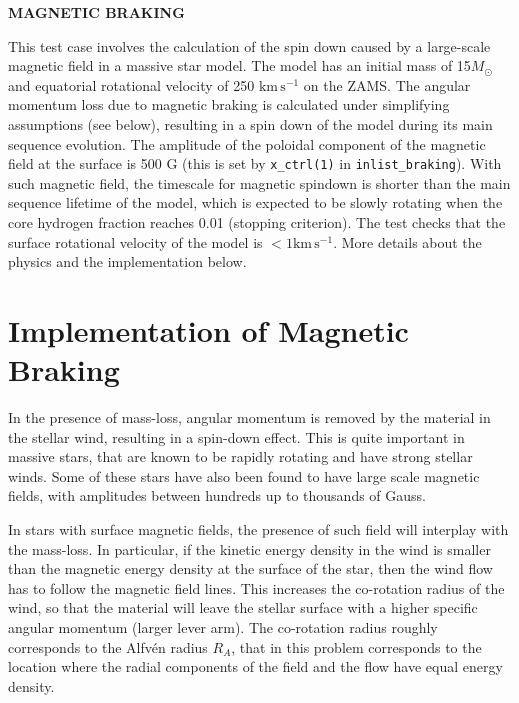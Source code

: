 \documentclass{article}
\newcommand{\unitstyle}[1]{\ensuremath{\mathrm{#1}}}
\newcommand{\second}{\unitstyle{s}}
\newcommand{\Msun}{\ensuremath{M_\odot}}
\newcommand{\kms}{\ensuremath{\mathrm{km} \,\second^{-1}}}
\begin{document}
	
	\begin{center}
		\begin{Large}
		       \textbf{MAGNETIC BRAKING}\\
		\end{Large}
	\end{center}



This test case involves the calculation of the spin down caused by a large-scale magnetic field in a massive star model. 
The model has an initial mass of 15$\Msun$ and equatorial rotational velocity of 250 $\kms$ on the ZAMS. The angular momentum loss due to magnetic braking is calculated under simplifying assumptions (see below), resulting in a spin down of the model 
during its main sequence evolution.
The amplitude of the poloidal component of the magnetic field at the surface is 500 G (this is set by \texttt{x\_ctrl(1)} in \texttt{inlist\_braking}). With such magnetic field, the timescale for magnetic spindown is shorter than the main sequence lifetime of the model, 
which is expected to be slowly rotating when the core hydrogen fraction reaches 0.01 (stopping criterion). The test checks that the surface rotational velocity of the model is  $< 1 \kms$. 
More details about the physics and the implementation below.  

\section{Implementation of Magnetic Braking}




In the presence of mass-loss, angular momentum is removed by the material in the stellar wind, resulting in a spin-down effect.
This is quite important in massive stars, that are known to be rapidly rotating and have strong stellar winds.
Some of these stars have also been found to have large scale magnetic fields, with amplitudes between hundreds up 
to thousands of Gauss. 


In stars with surface magnetic fields, the presence of such field will interplay with the mass-loss.
In particular,  if the kinetic energy density in the wind is smaller than the magnetic energy density at the surface of the star, 
then the wind flow has to follow the magnetic field lines. This increases the co-rotation radius of the wind, so that the material will leave the stellar surface with a higher specific 
angular momentum (larger lever arm).  The co-rotation radius  roughly corresponds to the Alfv\'en radius $R_A$,
that in this problem corresponds to the location where the radial components of the field and the flow have equal energy density.
\end{document}
